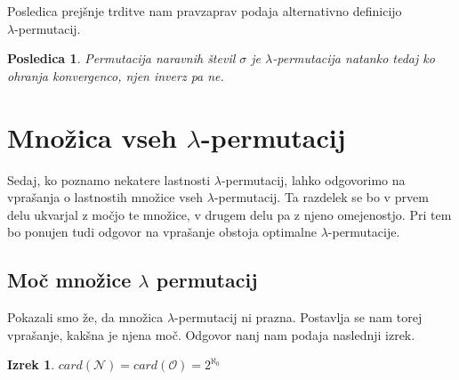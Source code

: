 \documentclass[12pt,a4paper,reqno]{amsart}
\theoremstyle{definition} %
\theoremstyle{plain} %
\newtheorem{izrek}[definicija]{Izrek}
\newtheorem{posledica}[definicija]{Posledica}
\begin{document}
Posledica prejšnje trditve nam pravzaprav podaja alternativno definicijo \\$\lambda$-permutacij.

\begin{posledica}
Permutacija naravnih števil $\sigma$ je $\lambda$-permutacija natanko tedaj ko ohranja konvergenco, njen inverz pa ne.
\end{posledica}

\section{Množica vseh $\lambda$-permutacij}

Sedaj, ko poznamo nekatere lastnosti $\lambda$-permutacij, lahko odgovorimo na vprašanja o lastnostih množice vseh $\lambda$-permutacij. Ta razdelek se bo v prvem delu ukvarjal z močjo te množice, v drugem delu pa z njeno omejenostjo. Pri tem bo ponujen tudi odgovor na vprašanje obstoja optimalne $\lambda$-permutacije.

\subsection{Moč množice $\lambda$ permutacij}

Pokazali smo že, da množica $\lambda$-permutacij ni prazna. Postavlja se nam torej vprašanje, kakšna je njena moč. Odgovor nanj nam podaja naslednji izrek.

\begin{izrek}
$card(\mathcal{N})=card(\mathcal{O})=2^{\aleph_0}$
\end{izrek}
\end{document}
